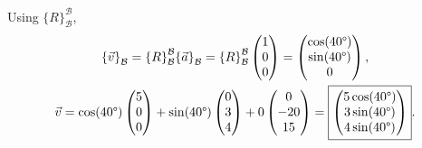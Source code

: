 \documentclass[12pt]{article}
\begin{document}
Using ${\{R\}}_{\mathcal{B}}^{\mathcal{B}}$, 
\begin{gather*}
	{\{\vec{v}\}}_{\mathcal{B}}
	=
	{\{R\}}_{\mathcal{B}}^{\mathcal{B}}
	{\{\vec{a}\}}_{\mathcal{B}}
	=
	{\{R\}}_{\mathcal{B}}^{\mathcal{B}}
	\begin{pmatrix} 1 \\ 0 \\ 0 \end{pmatrix}
	=
	\begin{pmatrix}
		\cos(40 \degree) \\
		\sin(40 \degree) \\
		0
	\end{pmatrix}
	,
	\\
	\vec{v}
	=
	\cos(40 \degree)
	\begin{pmatrix} 5 \\ 0 \\ 0 \end{pmatrix}
	+
	\sin(40 \degree)
	\begin{pmatrix} 0 \\ 3 \\ 4 \end{pmatrix}
	+
	0
	\begin{pmatrix} 0 \\ -20 \\ 15 \end{pmatrix}
	=
	\boxed{
		\begin{pmatrix}
			5 \cos(40 \degree) \\
			3 \sin(40 \degree) \\
			4 \sin(40 \degree)
		\end{pmatrix}
	}
	.
\end{gather*}
\end{document}

